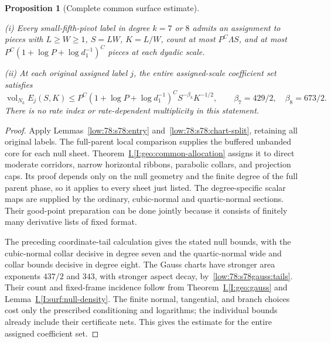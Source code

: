 \documentclass[11pt]{amsart}
\newtheorem{proposition}[theorem]{Proposition}
\theoremstyle{definition}
\theoremstyle{remark}
\numberwithin{equation}{section}
\newcommand{\partIref}[1]{\hyperref[I:#1]{I.\ref*{I:#1}}}
\begin{document}
\begin{proposition}[Complete common surface estimate]\label{low:78:s78:surface}

\noindent\textup{(i)} Every small-fifth-pivot label in degree $k=7$ or $8$ admits an assignment to pieces with $L\ge W\ge1$, $S=LW$, $K=L/W$, count at most $P^C\Lambda S$, and at most $P^C(1+\log P+\log d_1^{-1})^C$ pieces at each dyadic scale.

\noindent\textup{(ii)} At each original assigned label $j$, the entire assigned-scale coefficient set satisfies
\[
\operatorname{vol}_{N_k}E_j(S,K)\le P^C(1+\log P+\log d_1^{-1})^C S^{-\beta_k}K^{-1/2},\qquad \beta_7=429/2,\quad\beta_8=673/2.
\]
There is no rate index or rate-dependent multiplicity in this statement.
\end{proposition}
\begin{proof}
Apply Lemmas~\ref{low:78:s78:entry} and~\ref{low:78:s78:chart-split}, retaining all original labels. The full-parent local comparison supplies the buffered unbanded core for each null sheet. Theorem~\partIref{geo:common-allocation} assigns it to direct moderate corridors, narrow horizontal ribbons, parabolic collars, and projection caps. Its proof depends only on the null geometry and the finite degree of the full parent phase, so it applies to every sheet just listed. The degree-specific scalar maps are supplied by the ordinary, cubic-normal and quartic-normal sections. Their good-point preparation can be done jointly because it consists of finitely many derivative lists of fixed format.

The preceding coordinate-tail calculation gives the stated null bounds, with the cubic-normal collar decisive in degree seven and the quartic-normal wide and collar bounds decisive in degree eight. The Gauss charts have stronger area exponents $437/2$ and $343$, with stronger aspect decay, by~\eqref{low:78:s78gauss:tails}. Their count and fixed-frame incidence follow from Theorem~\partIref{geo:gauss} and Lemma~\partIref{surf:null-density}. The finite normal, tangential, and branch choices cost only the prescribed conditioning and logarithms; the individual bounds already include their certificate nets. This gives the estimate for the entire assigned coefficient set.
\end{proof}
\end{document}
